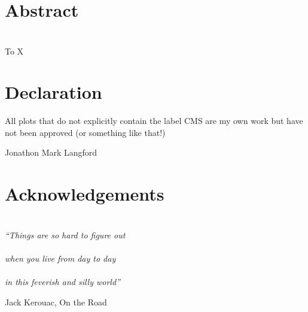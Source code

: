 \chapter*{\centering Abstract}


\chapter*{\centering }%
\begin{center}
    \thispagestyle{empty}
    To X
\end{center}


\chapter*{\centering Declaration}
All plots that do not explicitly contain the label CMS are my own work but have not been approved (or something like that!)


\begin{flushright}
    Jonathon Mark Langford
\end{flushright}


\chapter*{\centering Acknowledgements}

\tableofcontents
\listoffigures
\listoftables

\chapter*{}
\epigraph{
  \textit{``Things are so hard to figure out \\ \\
            when you live from day to day \\ \\
            in this feverish and silly world''}}
          {Jack Kerouac, On the Road}

\cleardoublepage
